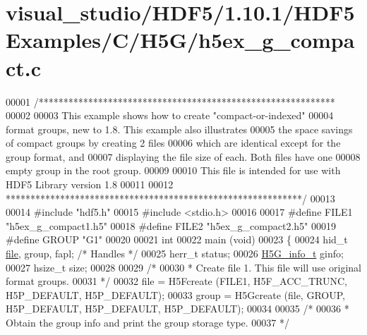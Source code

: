 \hypertarget{visual__studio_2_h_d_f5_21_810_81_2_h_d_f5_examples_2_c_2_h5_g_2h5ex__g__compact_8c_source}{}\section{visual\+\_\+studio/\+H\+D\+F5/1.10.1/\+H\+D\+F5\+Examples/\+C/\+H5\+G/h5ex\+\_\+g\+\_\+compact.c}
\label{visual__studio_2_h_d_f5_21_810_81_2_h_d_f5_examples_2_c_2_h5_g_2h5ex__g__compact_8c_source}

\begin{DoxyCode}
00001 \textcolor{comment}{/************************************************************}
00002 \textcolor{comment}{}
00003 \textcolor{comment}{  This example shows how to create "compact-or-indexed"}
00004 \textcolor{comment}{  format groups, new to 1.8.  This example also illustrates}
00005 \textcolor{comment}{  the space savings of compact groups by creating 2 files}
00006 \textcolor{comment}{  which are identical except for the group format, and}
00007 \textcolor{comment}{  displaying the file size of each.  Both files have one}
00008 \textcolor{comment}{  empty group in the root group.}
00009 \textcolor{comment}{}
00010 \textcolor{comment}{  This file is intended for use with HDF5 Library version 1.8}
00011 \textcolor{comment}{}
00012 \textcolor{comment}{ ************************************************************/}
00013 
00014 \textcolor{preprocessor}{#include "hdf5.h"}
00015 \textcolor{preprocessor}{#include <stdio.h>}
00016 
00017 \textcolor{preprocessor}{#define FILE1       "h5ex\_g\_compact1.h5"}
00018 \textcolor{preprocessor}{#define FILE2       "h5ex\_g\_compact2.h5"}
00019 \textcolor{preprocessor}{#define GROUP       "G1"}
00020 
00021 \textcolor{keywordtype}{int}
00022 main (\textcolor{keywordtype}{void})
00023 \{
00024     hid\_t       \hyperlink{structfile}{file}, group, fapl;         \textcolor{comment}{/* Handles */}
00025     herr\_t      status;
00026     \hyperlink{struct_h5_g__info__t}{H5G\_info\_t}  ginfo;
00027     hsize\_t     size;
00028 
00029     \textcolor{comment}{/*}
00030 \textcolor{comment}{     * Create file 1.  This file will use original format groups.}
00031 \textcolor{comment}{     */}
00032     file = H5Fcreate (FILE1, H5F\_ACC\_TRUNC, H5P\_DEFAULT, H5P\_DEFAULT);
00033     group = H5Gcreate (file, GROUP, H5P\_DEFAULT, H5P\_DEFAULT, H5P\_DEFAULT);
00034 
00035     \textcolor{comment}{/*}
00036 \textcolor{comment}{     * Obtain the group info and print the group storage type.}
00037 \textcolor{comment}{     */}

\end{DoxyCode}
